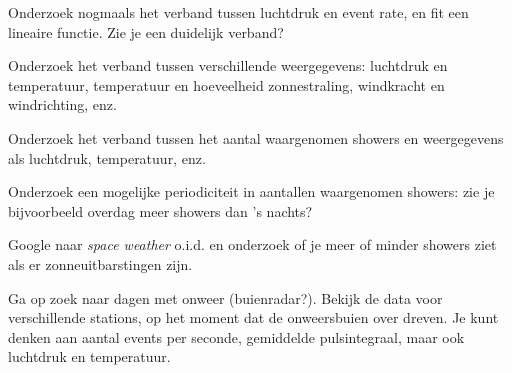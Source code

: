 \begin{questions}
\question Onderzoek nogmaals het verband tussen luchtdruk en event rate,
en fit een lineaire functie. Zie je een duidelijk verband?



\begin{savenotes}
\end{savenotes}

\question Onderzoek het verband tussen verschillende weergegevens:
luchtdruk en temperatuur, temperatuur en hoeveelheid zonnestraling,
windkracht en windrichting, enz.

\question Onderzoek het verband tussen het aantal waargenomen showers en
weergegevens als luchtdruk, temperatuur, enz.

\question Onderzoek een mogelijke periodiciteit in aantallen waargenomen
showers: zie je bijvoorbeeld overdag meer showers dan 's nachts?

\question Google naar \emph{space weather} o.i.d. en onderzoek of je meer
of minder showers ziet als er zonneuitbarstingen zijn.

\question Ga op zoek naar dagen met onweer (buienradar?). Bekijk de
\hisparc data voor verschillende stations, op het moment dat de
onweersbuien over dreven. Je kunt denken aan aantal events per seconde,
gemiddelde pulsintegraal, maar ook luchtdruk en temperatuur.


\end{questions}

